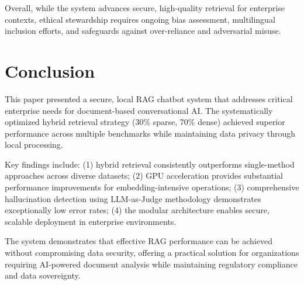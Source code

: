 \documentclass[conference]{IEEEtran}
\begin{document}
Overall, while the system advances secure, high-quality retrieval for enterprise contexts, ethical stewardship requires ongoing bias assessment, multilingual inclusion efforts, and safeguards against over-reliance and adversarial misuse.

\section{Conclusion}

This paper presented a secure, local RAG chatbot system that addresses critical enterprise needs for document-based conversational AI. The systematically optimized hybrid retrieval strategy (30\% sparse, 70\% dense) achieved superior performance across multiple benchmarks while maintaining data privacy through local processing.

Key findings include: (1) hybrid retrieval consistently outperforms single-method approaches across diverse datasets; (2) GPU acceleration provides substantial performance improvements for embedding-intensive operations; (3) comprehensive hallucination detection using LLM-as-Judge methodology demonstrates exceptionally low error rates; (4) the modular architecture enables secure, scalable deployment in enterprise environments.

The system demonstrates that effective RAG performance can be achieved without compromising data security, offering a practical solution for organizations requiring AI-powered document analysis while maintaining regulatory compliance and data sovereignty.

\FloatBarrier
\clearpage %
\balance



\end{document}
